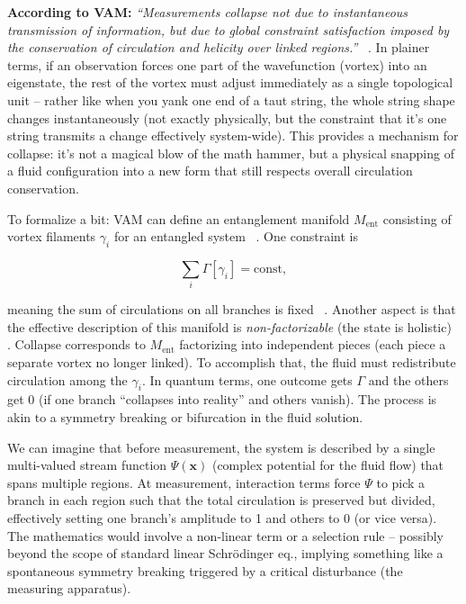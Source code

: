 \documentclass[a4paper, aps,preprint,superscriptaddress, 12pt]{revtex4}
\begin{document}
\textbf{According to VAM:} \textit{“Measurements collapse not due to instantaneous transmission of information, but due to global constraint satisfaction imposed by the conservation of circulation and helicity over linked regions.”}~\cite{Iskandarani2025c} . In plainer terms, if an observation forces one part of the wavefunction (vortex) into an eigenstate, the rest of the vortex must adjust immediately as a single topological unit – rather like when you yank one end of a taut string, the whole string shape changes instantaneously (not exactly physically, but the constraint that it’s one string transmits a change effectively system-wide). This provides a mechanism for collapse: it’s not a magical blow of the math hammer, but a physical snapping of a fluid configuration into a new form that still respects overall circulation conservation.


To formalize a bit: VAM can define an entanglement manifold $M_{\text{ent}}$ consisting of vortex filaments ${\gamma_i}$ for an entangled system~\cite{Iskandarani2025c} . One constraint is

\begin{equation}
    \sum_i \Gamma[\gamma_i] = \text{const},
\end{equation}

meaning the sum of circulations on all branches is fixed~\cite{Iskandarani2025c} . Another aspect is that the effective description of this manifold is \textit{non-factorizable} (the state is holistic)~\cite{Iskandarani2025c} . Collapse corresponds to $M_{\text{ent}}$ factorizing into independent pieces (each piece a separate vortex no longer linked). To accomplish that, the fluid must redistribute circulation among the $\gamma_i$. In quantum terms, one outcome gets $\Gamma$ and the others get 0 (if one branch “collapses into reality” and others vanish). The process is akin to a symmetry breaking or bifurcation in the fluid solution.


We can imagine that before measurement, the system is described by a single multi-valued stream function $\Psi(\mathbf{x})$ (complex potential for the fluid flow) that spans multiple regions. At measurement, interaction terms force $\Psi$ to pick a branch in each region such that the total circulation is preserved but divided, effectively setting one branch’s amplitude to 1 and others to 0 (or vice versa). The mathematics would involve a non-linear term or a selection rule – possibly beyond the scope of standard linear Schrödinger eq., implying something like a spontaneous symmetry breaking triggered by a critical disturbance (the measuring apparatus).
\end{document}
